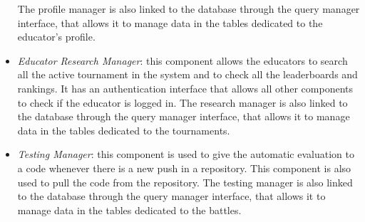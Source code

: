 \documentclass[12pt, a4paper]{report}
\begin{document}
\begin{itemize}
            The profile manager is also linked to the database through the query manager interface, that allows it to manage data in the tables dedicated to the educator's profile.
        \item \textit{Educator Research Manager}: this component allows the educators to search all the active tournament in the system and to check all the leaderboards and rankings. 
            It has an authentication interface that allows all other components to check if the educator is logged in.
            The research manager is also linked to the database through the query manager interface, that allows it to manage data in the tables dedicated to the tournaments.
        \item \textit{Testing Manager}: this component is used to give the automatic evaluation to a code whenever there is a new push in a repository. 
            This component is also used to pull the code from the repository. 
            The testing manager is also linked to the database through the query manager interface, that allows it to manage data in the tables dedicated to the battles.
    \end{itemize}
    
    \newpage
\end{document}
